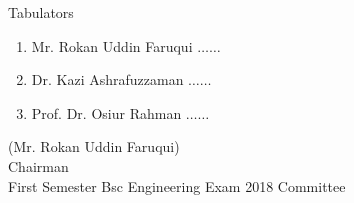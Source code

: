 \documentclass[12pt]{article}
\begin{document}
            \begin{table}[hb]
            	\centering
            \begin{minipage}[b]{0.5\linewidth} %
            {\centering Tabulators }
            \begin{enumerate}
                \item Mr. Rokan Uddin Faruqui \hspace*{1ex} $\ldots \ldots  $  
                \item Dr. Kazi Ashrafuzzaman \hspace*{1ex} $\ldots \ldots  $  
                \item Prof. Dr. Osiur Rahman \hspace*{1ex} $\ldots \ldots $  
            \end{enumerate} 

            \end{minipage}
            \hspace*{1.2cm}
            \begin{minipage}[b]{0.4\linewidth} \centering
            (Mr. Rokan Uddin Faruqui) \\
            Chairman  \hspace*{1ex} \\
           First Semester Bsc Engineering Exam 2018 Committee
            \end{minipage}
            \end{table}
            \clearpage
            \clearpage
            
\end{document}
